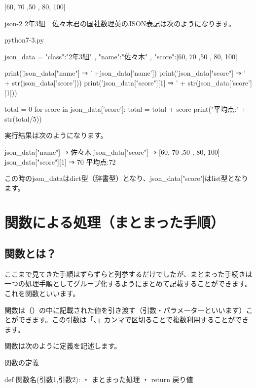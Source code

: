 \documentclass[11pt,a4paper,dvipdfmx,titlepage]{jsreport}
\begin{document}
[60, 70 ,50 , 80, 100]

\begin{pabox}{json-2}
2年3組　佐々木君の国社数理英のJSON表記は次のようになります。
\begin{codebox}{python7-3.py}
\begin{listing}{1}
json_data = {
  "class":"2年3組" ,
  "name":"佐々木" ,
  "score":[60, 70 ,50 , 80, 100]
  }
  
print('json_data["name"] ⇒ ' +json_data['name'])
print('json_data["score"] ⇒ ' + str(json_data['score']))
print('json_data["score"][1] ⇒ ' + str(json_data['score'][1]))

total = 0
for score in json_data['score']:
	total = total + score
print("平均点:" + str(total/5)) 
\end{listing}

実行結果は次のようになります。
\begin{listing}{1}
json_data["name"] ⇒ 佐々木
json_data["score"] ⇒ [60, 70 ,50 , 80, 100]
json_data["score"][1] ⇒ 70
平均点:72
\end{listing}

\end{codebox}
\end{pabox}
この時のjson\_dataはdict型（辞書型）となり、json\_data["score"]はlist型となります。

\newpage
\section{関数による処理（まとまった手順）}
\subsection{関数とは？}
ここまで見てきた手順はずらずらと列挙するだけでしたが、まとまった手続きは一つの処理手順としてグループ化するようにまとめて記載することができます。
これを関数といいます。

関数は（）の中に記載された値を引き渡す（引数・パラメーターといいます）ことができます。この引数は「、」カンマで区切ることで複数利用することができます。

関数は次のように定義を記述します。
\begin{grabox}{関数の定義}
\begin{listing}{1}
def 関数名(引数1,引数2):
    ・
    まとまった処理
    ・
    return 戻り値
\end{listing}
\end{grabox}
\end{document}
